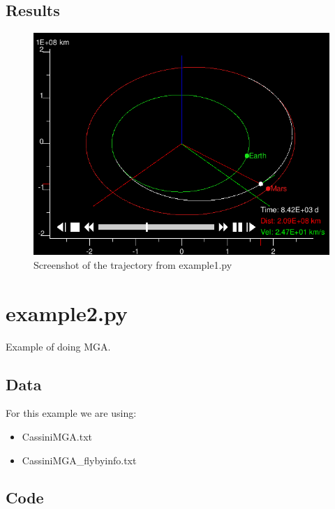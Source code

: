 \documentclass[a4paper,11pt]{article}
\begin{document}
\subsection{Results}
\begin{figure}[H]
\centering
\includegraphics[width=1\textwidth]{img/example1}
\caption{Screenshot of the trajectory from example1.py}
\label{img:example1}
\end{figure}


\newpage
\section{example2.py}
Example of doing \gls{MGA}.
\subsection{Data}
For this example we are using:

\begin{itemize}
\item CassiniMGA.txt
\item CassiniMGA\_flybyinfo.txt
\end{itemize}
\subsection{Code}

\end{document}
